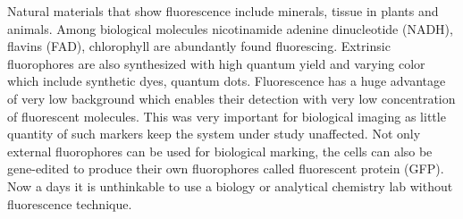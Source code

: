 \documentclass[11pt,a4paper,onecolumn]{article}
\begin{document}
Natural materials that show fluorescence include minerals, tissue in plants and animals.
Among biological molecules nicotinamide adenine dinucleotide (NADH), flavins (FAD), chlorophyll are abundantly found fluorescing.
Extrinsic fluorophores are also synthesized with high quantum yield and varying color which include synthetic dyes, quantum dots.
Fluorescence has a huge advantage of very low background which enables their detection with very low concentration of fluorescent molecules.
This was very important for biological imaging as little quantity of such markers keep the system under study unaffected.
Not only external fluorophores can be used for biological marking, the cells can also be gene-edited to produce their own fluorophores called fluorescent protein (GFP).
Now a days it is unthinkable to use a biology or analytical chemistry lab without fluorescence technique.
\end{document}
